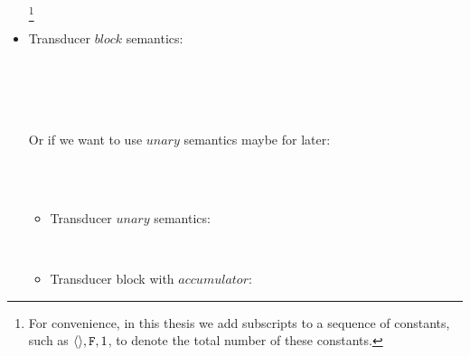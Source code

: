 \begin{itemize}
\footnote{For convenience, in this thesis we add subscripts to a sequence of constants, such as $\langle \rangle, \mathtt{F}, 1$, to denote the total number of these constants.}

\item Transducer $block$ semantics: \\ 


 \\

 \\

\\

\\


Or if we want to use $unary$ semantics maybe for later: \\
\begin{mdframed}
\\[2ex]

\\[2ex]

\begin{itemize}
\item Transducer $unary$ semantics:\\ 


\PT{ \Axiom{\usum(\oF) \dda \vunit}}
\PT{\Axiom{\usum(\oT) \dda \emptyv }} \\[1ex]


\item Transducer block with $accumulator$: \\


\end{itemize}
\end{mdframed}
\end{itemize}
